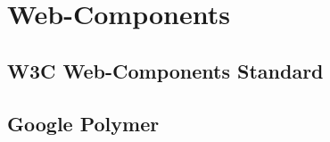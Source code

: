 \section{Web-Components}
\label{sec:3_Web_Components}



\subsection{W3C Web-Components Standard}
\label{sec:3_W3C}













\subsection{Google Polymer}
\label{sec:3_Polymer}









